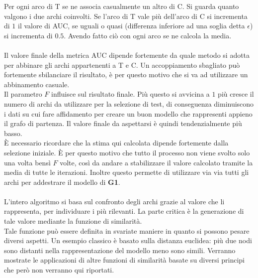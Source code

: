 Per ogni arco di T se ne associa casualmente un altro di C. Si guarda quanto valgono i due archi coinvolti. Se l'arco di T vale più dell'arco di C si incrementa di $1$ il valore di AUC, se uguali o quasi (differenza inferiore ad una soglia detta $ \epsilon$) si incrementa di $0.5$. Avendo fatto ciò con ogni arco se ne calcola la media.\\
\\
Il valore finale della metrica AUC dipende fortemente da quale metodo si adotta per abbinare gli archi appartenenti a T e C. Un accoppiamento sbagliato può fortemente sbilanciare il risultato, è per questo motivo che si va ad utilizzare un abbinamento casuale.\\
Il parametro $F$ influisce sul risultato finale. Più questo si avvicina a $1$ più cresce il numero di archi da utilizzare per la selezione di test, di conseguenza diminuiscono i dati su cui fare affidamento per creare un buon modello che rappresenti appieno il grafo di partenza. Il valore finale da aspettarsi è quindi tendenzialmente più basso.\\
È necessario ricordare che la stima qui calcolata dipende fortemente dalla selezione iniziale. È per questo motivo che tutto il processo non viene svolto solo una volta bensì $F$ volte, così da andare a stabilizzare il valore calcolato tramite la media di tutte le iterazioni. Inoltre questo permette di utilizzare via via tutti gli archi per addestrare il modello di \textbf{G1}.\\
\\
L'intero algoritmo si basa sul confronto degli archi grazie al valore che li rappresenta, per individuare i più rilevanti. La parte critica è la generazione di tale valore mediante la funzione di similarità.\\
Tale funzione può essere definita in svariate maniere in quanto si possono pesare diversi aspetti. Un esempio classico è basato sulla distanza euclidea: più due nodi sono distanti nella rappresentazione del modello meno sono simili. Verranno mostrate le applicazioni di altre funzioni di similarità basate su diversi principi che però non verranno qui riportati.
%
